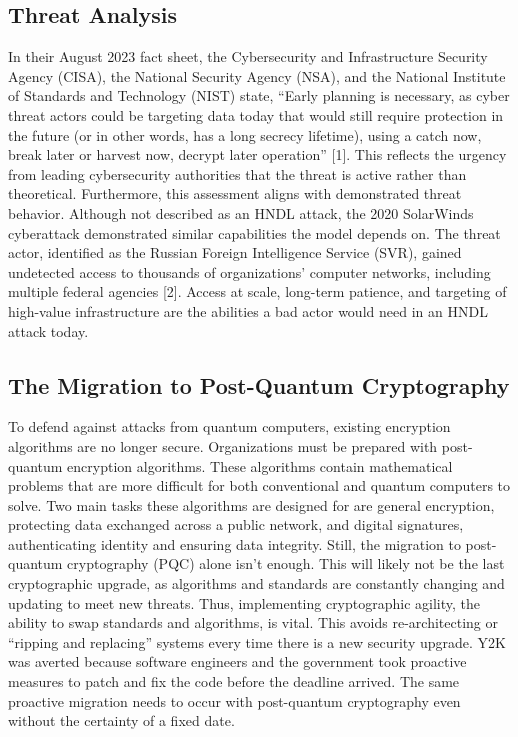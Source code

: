 \documentclass{article}
\begin{document}
\subsection{Threat Analysis}

In their August 2023 fact sheet, the Cybersecurity and Infrastructure Security Agency (CISA), the National Security Agency (NSA), and the National Institute of Standards and Technology (NIST) state, “Early planning is necessary, as cyber threat actors could be targeting data today that would still require protection in the future (or in other words, has a long secrecy lifetime), using a catch now, break later or harvest now, decrypt later operation” [1]. This reflects the urgency from leading cybersecurity authorities that the threat is active rather than theoretical. Furthermore, this assessment aligns with demonstrated threat behavior. Although not described as an HNDL attack, the 2020 SolarWinds cyberattack demonstrated similar capabilities the model depends on. The threat actor, identified as the Russian Foreign Intelligence Service (SVR), gained undetected access to thousands of organizations’ computer networks, including multiple federal agencies [2]. Access at scale, long-term patience, and targeting of high-value infrastructure are the abilities a bad actor would need in an HNDL attack today. 

\subsection {The Migration to Post-Quantum Cryptography}

To defend against attacks from quantum computers, existing encryption algorithms are no longer secure. Organizations must be prepared with post-quantum encryption algorithms. These algorithms contain mathematical problems that are more difficult for both conventional and quantum computers to solve. Two main tasks these algorithms are designed for are general encryption, protecting data exchanged across a public network, and digital signatures, authenticating identity and ensuring data integrity. Still, the migration to post-quantum cryptography (PQC) alone isn't enough. This will likely not be the last cryptographic upgrade, as algorithms and standards are constantly changing and updating to meet new threats. Thus, implementing cryptographic agility, the ability to swap standards and algorithms, is vital. This avoids re-architecting or “ripping and replacing” systems every time there is a new security upgrade. Y2K was averted because software engineers and the government took proactive measures to patch and fix the code before the deadline arrived. The same proactive migration needs to occur with post-quantum cryptography even without the certainty of a fixed date. 
\end{document}
